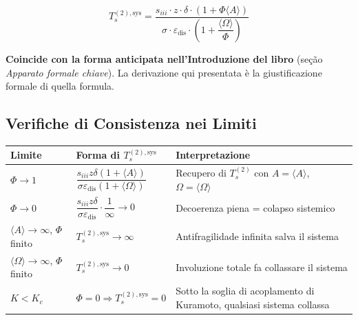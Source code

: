 \[
\boxed{T_s^{(2),\text{sys}} = \frac{s_{iii} \cdot z \cdot \delta \cdot \left(1 + \Phi \langle A \rangle\right)}{\sigma \cdot \varepsilon_{\text{dis}} \cdot \left(1 + \dfrac{\langle \Omega \rangle}{\Phi}\right)}}
\]

\Proved{} \textbf{Coincide con la forma anticipata nell'Introduzione del
libro} (seção \emph{Apparato formale chiave}). La derivazione qui
presentata è la giustificazione formale di quella formula.

\subsection{Verifiche di Consistenza nei
Limiti}\label{verifiche-di-consistenza-nei-limiti}

{\def\LTcaptype{none} %
{\small\begin{longtable}[]{@{}
  >{\raggedright\arraybackslash}p{}
  >{\raggedright\arraybackslash}p{}
  >{\raggedright\arraybackslash}p{}@{}}
\toprule\noalign{}
\begin{minipage}[b]{\linewidth}\raggedright
Limite
\end{minipage} & \begin{minipage}[b]{\linewidth}\raggedright
Forma di \(T_s^{(2),\text{sys}}\)
\end{minipage} & \begin{minipage}[b]{\linewidth}\raggedright
Interpretazione
\end{minipage} \\
\midrule\noalign{}
\endhead
\bottomrule\noalign{}
\endlastfoot
\(\Phi \to 1\) &
\(\dfrac{s_{iii} z \delta (1+\langle A\rangle)}{\sigma \varepsilon_{\text{dis}} (1+\langle\Omega\rangle)}\)
& Recupero di \(T_s^{(2)}\) con \(A = \langle A\rangle\),
\(\Omega = \langle\Omega\rangle\) \Proved{} \\
\(\Phi \to 0\) &
\(\dfrac{s_{iii} z \delta}{\sigma \varepsilon_{\text{dis}}} \cdot \dfrac{1}{\infty} \to 0\)
& Decoerenza piena = colapso sistemico \Proved{} \\
\(\langle A\rangle \to \infty\), \(\Phi\) finito &
\(T_s^{(2),\text{sys}} \to \infty\) & Antifragilidade infinita salva il
sistema \Proved{} \\
\(\langle\Omega\rangle \to \infty\), \(\Phi\) finito &
\(T_s^{(2),\text{sys}} \to 0\) & Involuzione totale fa collassare il
sistema \Proved{} \\
\(K < K_c\) & \(\Phi = 0 \Rightarrow T_s^{(2),\text{sys}} = 0\) & Sotto
la soglia di acoplamento di Kuramoto, qualsiasi sistema collassa
\Proved{} \\
\end{longtable}}
}

